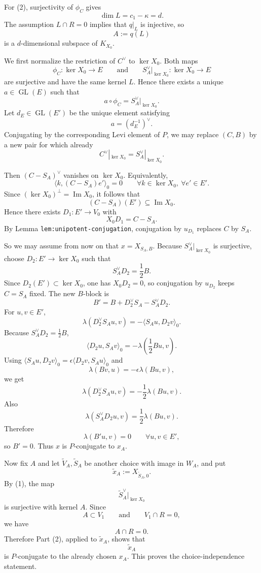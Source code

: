 \documentclass[
  11pt,
]{article}
\begin{document}
For (2), surjectivity of \(\phi_C\) gives \[
\dim L=c_1-\kappa=d.
\] The assumption \(L\cap R=0\) implies that \(q|_L\) is injective, so
\[
A:=q(L)
\] is a \(d\)-dimensional subspace of \(K_{X_0}\).

We first normalize the restriction of \(C^\vee\) to \(\ker X_0\). Both
maps \[
\phi_C:\ker X_0\to E
\qquad\text{and}\qquad
S_A^\vee|_{\ker X_0}:\ker X_0\to E
\] are surjective and have the same kernel \(L\). Hence there exists a
unique \(a\in \operatorname{GL}(E)\) such that \[
a\circ \phi_C = S_A^\vee|_{\ker X_0}.
\] Let \(d_E\in \operatorname{GL}(E')\) be the unique element satisfying
\[
a=(d_E^{-1})^\vee.
\] Conjugating by the corresponding Levi element of \(P\), we may
replace \((C,B)\) by a new pair for which already \[
C^\vee|_{\ker X_0}=S_A^\vee|_{\ker X_0}.
\]

Then \((C-S_A)^\vee\) vanishes on \(\ker X_0\). Equivalently, \[
\langle k,(C-S_A)e'\rangle_0=0
\qquad \forall k\in \ker X_0,\ \forall e'\in E'.
\] Since \((\ker X_0)^\perp=\operatorname{Im} X_0\), it follows that \[
(C-S_A)(E')\subseteq \operatorname{Im} X_0.
\] Hence there exists \(D_1:E'\to V_0\) with \[
X_0D_1=C-S_A.
\] By Lemma \texttt{lem:unipotent-conjugation}, conjugation by
\(u_{D_1}\) replaces \(C\) by \(S_A\).

So we may assume from now on that \(x=X_{S_A,B}\). Because
\(S_A^\vee|_{\ker X_0}\) is surjective, choose \(D_2:E'\to \ker X_0\)
such that \[
S_A^\vee D_2=\frac12 B.
\] Since \(D_2(E')\subset \ker X_0\), one has \(X_0D_2=0\), so
conjugation by \(u_{D_2}\) keeps \(C=S_A\) fixed. The new \(B\)-block is
\[
B' = B + D_2^\vee S_A - S_A^\vee D_2.
\] For \(u,v\in E'\), \[
\lambda(D_2^\vee S_Au,v)=-\langle S_Au,D_2v\rangle_0.
\] Because \(S_A^\vee D_2=\frac12 B\), \[
\langle D_2u,S_Av\rangle_0
=-\lambda\!\left(\frac12 Bu,v\right).
\] Using
\(\langle S_Au,D_2v\rangle_0=\epsilon\langle D_2v,S_Au\rangle_0\) and \[
\lambda(Bv,u)=-\epsilon\lambda(Bu,v),
\] we get \[
\lambda(D_2^\vee S_Au,v)=-\frac12\lambda(Bu,v).
\] Also \[
\lambda(S_A^\vee D_2u,v)=\frac12\lambda(Bu,v).
\] Therefore \[
\lambda(B'u,v)=0
\qquad \forall u,v\in E',
\] so \(B'=0\). Thus \(x\) is \(P\)-conjugate to \(x_A\).

Now fix \(A\) and let \(\widetilde V_A,\widetilde S_A\) be another
choice with image in \(W_A\), and put \[
\widetilde x_A:=X_{\widetilde S_A,0}.
\] By (1), the map \[
\widetilde S_A^\vee|_{\ker X_0}
\] is surjective with kernel \(A\). Since \[
A\subset V_1
\qquad\text{and}\qquad
V_1\cap R=0,
\] we have \[
A\cap R=0.
\] Therefore Part (2), applied to \(\widetilde x_A\), shows that \[
\widetilde x_A
\] is \(P\)-conjugate to the already chosen \(x_A\). This proves the
choice-independence statement.
\end{document}
